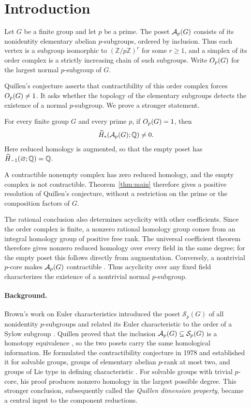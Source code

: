 \section{Introduction}\label{sec:introduction}

Let $G$ be a finite group and let $p$ be a prime. The poset $\mathcal A_p(G)$
consists of its nonidentity elementary abelian $p$-subgroups, ordered by
inclusion. Thus each vertex is a subgroup isomorphic to $(\mathbb Z/p\mathbb
Z)^r$ for some $r\geq1$, and a simplex of its order complex is a strictly
increasing chain of such subgroups. Write $O_p(G)$ for the largest normal
$p$-subgroup of $G$.

Quillen's conjecture asserts that contractibility of this order complex
forces $O_p(G)\ne1$. It asks whether the topology of the elementary
subgroups detects the existence of a normal $p$-subgroup. We prove a
stronger statement.

\begin{theorem}\label{thm:main}
For every finite group $G$ and every prime $p$, if $O_p(G)=1$, then
\[
\widetilde H_*(\mathcal A_p(G);\mathbb Q)\ne0.
\]
Here reduced homology is augmented, so that the empty poset has
$\widetilde H_{-1}(\varnothing;\mathbb Q)=\mathbb Q$.
\end{theorem}

A contractible nonempty complex has zero reduced homology, and the empty
complex is not contractible. Theorem~\ref{thm:main} therefore gives a
positive resolution of Quillen's conjecture, without a restriction on
the prime or the composition factors of $G$.

The rational conclusion also determines acyclicity with other
coefficients. Since the order complex is finite, a nonzero rational
homology group comes from an integral homology group of positive free
rank. The universal coefficient theorem therefore gives nonzero reduced
homology over every field in the same degree; for the empty poset this
follows directly from augmentation. Conversely, a nontrivial $p$-core
makes $\mathcal A_p(G)$ contractible \citep[Proposition~2.4]{Quillen1978}.
Thus acyclicity over any fixed field characterizes the existence of a
nontrivial normal $p$-subgroup.

\paragraph{Background.}
Brown's work on Euler characteristics introduced the poset
$\mathcal S_p(G)$ of all nonidentity $p$-subgroups and related its Euler
characteristic to the order of a Sylow subgroup \citep{Brown1975}.
Quillen proved that the inclusion $\mathcal A_p(G)\subseteq\mathcal S_p(G)$ is a
homotopy equivalence \citep[Proposition~2.1]{Quillen1978}, so the two
posets carry the same homological information. He formulated the
contractibility conjecture in 1978 and established it for solvable
groups, groups of elementary abelian $p$-rank at most two, and groups
of Lie type in defining characteristic
\citep[Conjecture~2.9, Proposition~2.10, Theorem~3.1, and
Corollary~12.2]{Quillen1978}. For solvable groups with trivial $p$-core,
his proof produces nonzero homology in the largest possible degree.
This stronger conclusion, subsequently called the \emph{Quillen
dimension property}, became a central input to the component reductions.

